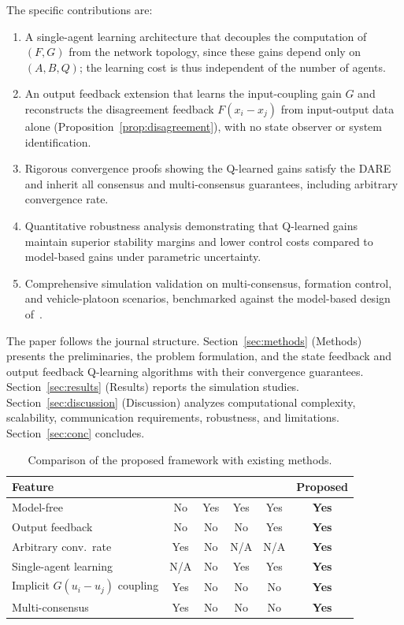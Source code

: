 \documentclass[12pt]{elsarticle}
\theoremstyle{remark}
\begin{document}
The specific contributions are:
\begin{enumerate}
    \item[(i)] A single-agent learning architecture that decouples the computation of $(F,G)$ from the network topology, since these gains depend only on $(A,B,Q)$; the learning cost is thus independent of the number of agents.
    \item[(ii)] An output feedback extension that learns the input-coupling gain $G$ and reconstructs the disagreement feedback $F(x_i-x_j)$ from input-output data alone (Proposition~\ref{prop:disagreement}), with no state observer or system identification.
    \item[(iii)] Rigorous convergence proofs showing the Q-learned gains satisfy the DARE and inherit all consensus and multi-consensus guarantees, including arbitrary convergence rate.
    \item[(iv)] Quantitative robustness analysis demonstrating that Q-learned gains maintain superior stability margins and lower control costs compared to model-based gains under parametric uncertainty.
    \item[(v)] Comprehensive simulation validation on multi-consensus, formation control, and vehicle-platoon scenarios, benchmarked against the model-based design of~\cite{cacace2024}.
\end{enumerate}

The paper follows the journal structure. Section~\ref{sec:methods} (Methods) presents the preliminaries, the problem formulation, and the state feedback and output feedback Q-learning algorithms with their convergence guarantees. Section~\ref{sec:results} (Results) reports the simulation studies. Section~\ref{sec:discussion} (Discussion) analyzes computational complexity, scalability, communication requirements, robustness, and limitations. Section~\ref{sec:conc} concludes.

\begin{table}[htbp]
\centering
\caption{Comparison of the proposed framework with existing methods.}
\label{tab:comparison}
\small
\setlength{\tabcolsep}{4.5pt}
\begin{tabular}{lccccc}
\toprule
Feature & \cite{cacace2024} & \cite{zhang2011} & \cite{bradtke1994} & \cite{rizvi2022} & \textbf{Proposed} \\
\midrule
Model-free & No & Yes & Yes & Yes & \textbf{Yes} \\
Output feedback & No & No & No & Yes & \textbf{Yes} \\
Arbitrary conv.\ rate & Yes & No & N/A & N/A & \textbf{Yes} \\
Single-agent learning & N/A & No & Yes & Yes & \textbf{Yes} \\
Implicit $G(u_i{-}u_j)$ coupling & Yes & No & No & No & \textbf{Yes} \\
Multi-consensus & Yes & No & No & No & \textbf{Yes} \\
\bottomrule
\end{tabular}
\end{table}
\end{document}
